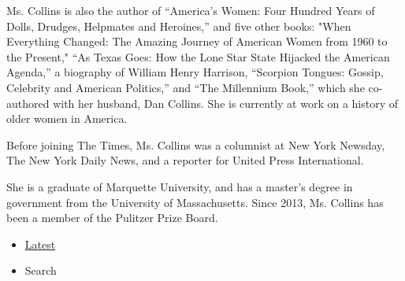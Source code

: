 Ms. Collins is also the author of ``America's Women: Four Hundred Years
of Dolls, Drudges, Helpmates and Heroines,'' and five other books: "When
Everything Changed: The Amazing Journey of American Women from 1960 to
the Present," ``As Texas Goes: How the Lone Star State Hijacked the
American Agenda,'' a biography of William Henry Harrison, ``Scorpion
Tongues: Gossip, Celebrity and American Politics,'' and ``The Millennium
Book,'' which she co-authored with her husband, Dan Collins. She is
currently at work on a history of older women in America.

Before joining The Times, Ms. Collins was a columnist at New York
Newsday, The New York Daily News, and a reporter for United Press
International.

She is a graduate of Marquette University, and has a master's degree in
government from the University of Massachusetts. Since 2013, Ms. Collins
has been a member of the Pulitzer Prize Board.

\begin{itemize}
\tightlist
\item
  \protect\hyperlink{stream-panel}{Latest}
\item
  Search
\end{itemize}


